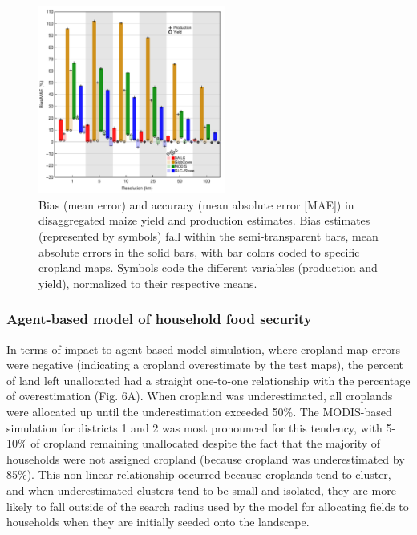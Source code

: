 \documentclass[12 pt, titlepage, a4paper]{article}
\begin{document}
\begin{figure}[!ht]
\centerline{\includegraphics[width=0.55\textwidth]{figures/fig5.pdf}}
\caption{Bias (mean error) and accuracy (mean absolute error [MAE]) in disaggregated maize yield and production estimates. Bias estimates (represented by symbols) fall within the semi-transparent bars, mean absolute errors in the solid bars, with bar colors coded to specific cropland maps.  Symbols code the different variables (production and yield), normalized to their respective means.}
\label{afoto}
\end{figure}

\vspace{-0.3 cm}
\subsubsection*{Agent-based model of household food security}
\vspace{-0.2 cm}
In terms of impact to agent-based model simulation, where cropland map errors were negative (indicating a cropland overestimate by the test maps), the percent of land left unallocated had a straight one-to-one relationship with the percentage of overestimation (Fig. 6A). When cropland was underestimated, all croplands were allocated up until the underestimation exceeded 50\%. The MODIS-based simulation for districts 1 and 2 was most pronounced for this tendency, with 5-10\% of cropland remaining unallocated despite the fact that the majority of households were not assigned cropland (because cropland was underestimated by 85\%). This non-linear relationship occurred because croplands tend to cluster, and when underestimated clusters tend to be small and isolated, they are more likely to fall outside of the search radius used by the model for allocating fields to households when they are initially seeded onto the landscape. 
\end{document}
